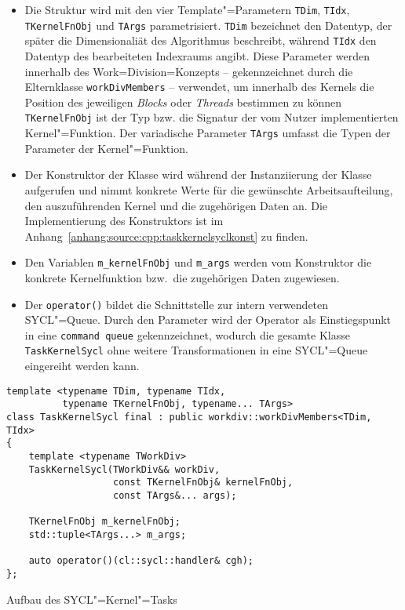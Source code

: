 \begin{itemize}
    \item Die Struktur wird mit den vier Template"=Parametern \texttt{TDim},
          \texttt{TIdx}, \texttt{TKernelFnObj} und \texttt{TArgs}
          parametrisiert. \texttt{TDim} bezeichnet den Datentyp, der später die
          Dimensionaliät des Algorithmus beschreibt, während \texttt{TIdx} den
          Datentyp des bearbeiteten Indexraums angibt. Diese Parameter werden
          innerhalb des Work=Division=Konzepts -- gekennzeichnet durch die
          Elternklasse \texttt{workDivMembers} -- verwendet, um innerhalb des
          Kernels die Position des jeweiligen \textit{Blocks} oder
          \textit{Threads} bestimmen zu können \texttt{TKernelFnObj} ist der Typ
          bzw. die Signatur der vom Nutzer implementierten Kernel"=Funktion. Der
          variadische Parameter \texttt{TArgs} umfasst die Typen der Parameter
          der Kernel"=Funktion.
    \item Der Konstruktor der Klasse wird während der Instanziierung der Klasse
          aufgerufen und nimmt konkrete Werte für die gewünschte
          Arbeitsaufteilung, den auszuführenden Kernel und die zugehörigen Daten
          an. Die Implementierung des Konstruktors ist im
          Anhang~\ref{anhang:source:cpp:taskkernelsyclkonst} zu finden.
    \item Den Variablen \texttt{m\_kernelFnObj} und \texttt{m\_args} werden vom
          Konstruktor die konkrete Kernelfunktion bzw.\ die zugehörigen Daten
          zugewiesen.
    \item Der \texttt{operator()} bildet die Schnittstelle zur intern
          verwendeten SYCL"=Queue. Durch den Parameter wird der Operator als
          Einstiegspunkt in eine \texttt{command queue} gekennzeichnet, wodurch
          die gesamte Klasse \texttt{TaskKernelSycl} ohne weitere
          Transformationen in eine SYCL"=Queue eingereiht werden kann.
\end{itemize}

\begin{code}
    \begin{verbatim}
template <typename TDim, typename TIdx,
          typename TKernelFnObj, typename... TArgs>
class TaskKernelSycl final : public workdiv::workDivMembers<TDim, TIdx>
{
    template <typename TWorkDiv>
    TaskKernelSycl(TWorkDiv&& workDiv,
                   const TKernelFnObj& kernelFnObj,
                   const TArgs&... args);

    TKernelFnObj m_kernelFnObj;
    std::tuple<TArgs...> m_args;

    auto operator()(cl::sycl::handler& cgh);
};
    \end{verbatim}
    \caption{Aufbau des SYCL"=Kernel"=Tasks}
    \label{implementierung:task:kernel:struktur}
\end{code}

